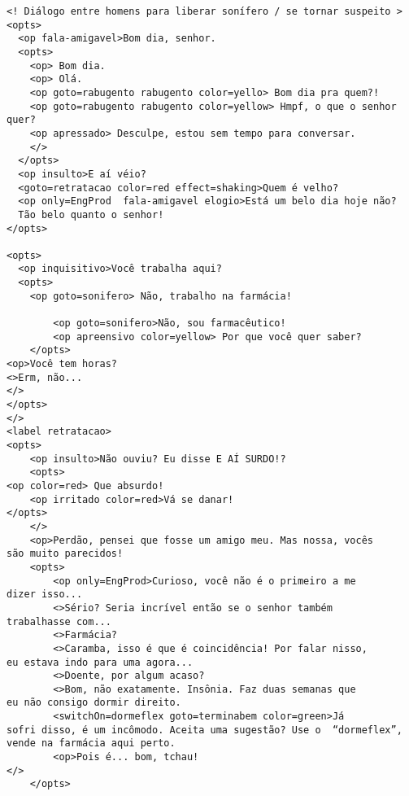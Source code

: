 {\footnotesize
\begin{verbatim}
<! Diálogo entre homens para liberar sonífero / se tornar suspeito >
<opts>
  <op fala-amigavel>Bom dia, senhor.
  <opts>
    <op> Bom dia.
    <op> Olá.
    <op goto=rabugento rabugento color=yello> Bom dia pra quem?!
    <op goto=rabugento rabugento color=yellow> Hmpf, o que o senhor quer?
    <op apressado> Desculpe, estou sem tempo para conversar.
    </>
  </opts>
  <op insulto>E aí véio?
  <goto=retratacao color=red effect=shaking>Quem é velho?
  <op only=EngProd  fala-amigavel elogio>Está um belo dia hoje não?
  Tão belo quanto o senhor!
</opts>

<opts>
  <op inquisitivo>Você trabalha aqui?
  <opts>
    <op goto=sonifero> Não, trabalho na farmácia!
		
		<op goto=sonifero>Não, sou farmacêutico!
		<op apreensivo color=yellow> Por que você quer saber?
	</opts>
<op>Você tem horas?
<>Erm, não...
</>
</opts>
</>
<label retratacao>
<opts>
	<op insulto>Não ouviu? Eu disse E AÍ SURDO!?
	<opts>
<op color=red> Que absurdo!
	<op irritado color=red>Vá se danar!
</opts>
	</>
	<op>Perdão, pensei que fosse um amigo meu. Mas nossa, vocês
são muito parecidos!
	<opts>
		<op only=EngProd>Curioso, você não é o primeiro a me
dizer isso...
		<>Sério? Seria incrível então se o senhor também
trabalhasse com...
		<>Farmácia?
		<>Caramba, isso é que é coincidência! Por falar nisso,
eu estava indo para uma agora...
		<>Doente, por algum acaso?
		<>Bom, não exatamente. Insônia. Faz duas semanas que
eu não consigo dormir direito.
		<switchOn=dormeflex goto=terminabem color=green>Já
sofri disso, é um incômodo. Aceita uma sugestão? Use o  “dormeflex”,
vende na farmácia aqui perto.
		<op>Pois é... bom, tchau!
</>
	</opts>


\end{verbatim}}
